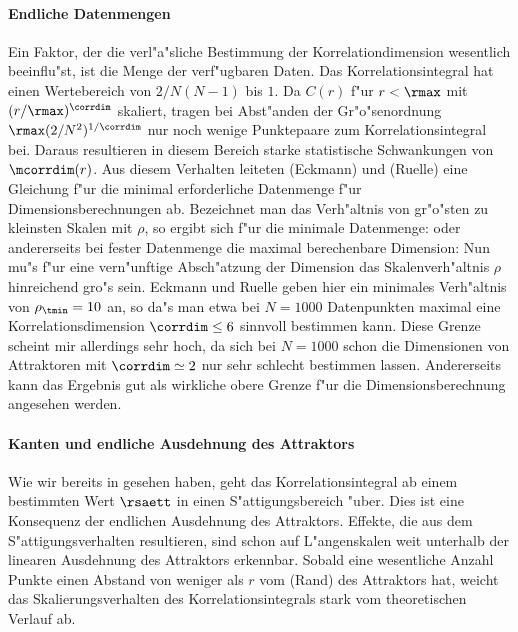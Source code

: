 \paragraph{Endliche Datenmengen}
Ein Faktor, der die verl"a"sliche Bestimmung der Korrelationdimension wesentlich
beeinflu"st, ist die Menge der verf"ugbaren Daten. Das Korrelationsintegral hat einen
Wertebereich von $2/N(N-1)$ bis $1$. Da $C(r)$ f"ur $r<\rmax$ mit $(r/\rmax)^\corrdim$ skaliert, tragen
bei Abst"anden der Gr"o"senordnung $\rmax(2/N^2)^{1/\corrdim}$ nur noch wenige Punktepaare 
zum Korrelationsintegral bei. Daraus resultieren in diesem Bereich starke statistische
Schwankungen von $\mcorrdim(r)$. Aus diesem Verhalten leiteten \autor(Eckmann) und \autor(Ruelle)
\cite{Eckmann-ruelle2} eine Gleichung f"ur die minimal erforderliche Datenmenge f"ur
Dimensionsberechnungen ab. Bezeichnet man das Verh"altnis von gr"o"sten zu kleinsten
Skalen mit $\rho$, so ergibt sich f"ur die minimale Datenmenge:
oder andererseits bei fester Datenmenge die maximal berechenbare Dimension:
Nun mu"s f"ur eine vern"unftige Absch"atzung der Dimension das Skalenverh"altnis $\rho$
hinreichend gro"s sein. Eckmann und Ruelle geben hier ein minimales Verh"altnis von
$\rho_\tmin=10$ an, so da"s man etwa bei $N=1000$ Datenpunkten maximal eine
Korrelationsdimension $\corrdim\leq 6$ sinnvoll bestimmen kann. Diese Grenze scheint mir
allerdings sehr hoch, da sich bei $N=1000$ schon die Dimensionen von Attraktoren mit
$\corrdim\simeq 2$ nur sehr schlecht bestimmen lassen. Andererseits kann das Ergebnis gut
als wirkliche obere Grenze f"ur die Dimensionsberechnung angesehen werden. 




\paragraph{Kanten und endliche Ausdehnung des Attraktors}
Wie wir bereits in  gesehen haben, geht das Korrelationsintegral ab einem
bestimmten Wert $\rsaett$ in einen S"attigungsbereich "uber. Dies ist eine Konsequenz der
endlichen Ausdehnung des Attraktors. Effekte, die aus dem S"attigungsverhalten resultieren, 
sind schon auf L"angen\-skalen weit unterhalb der linearen Ausdehnung des Attraktors
erkennbar. Sobald eine wesentliche Anzahl Punkte einen Abstand von weniger als $r$ vom
\naja(Rand) des Attraktors hat, weicht das Skalierungsverhalten des Korrelationsintegrals
stark vom theoretischen Verlauf ab.

